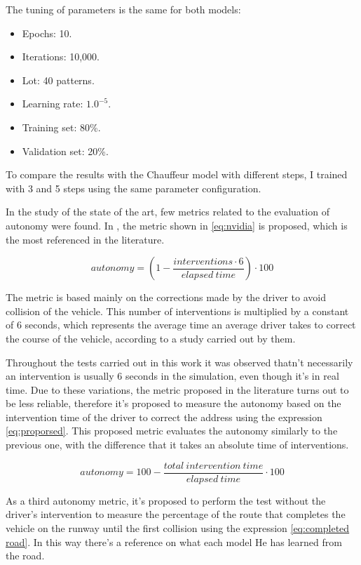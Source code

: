 \documentclass[conference]{IEEEtran}
\begin{document}
The tuning of parameters is the same for both models:
\begin{itemize}
	\item Epochs: 10.
	\item Iterations: 10,000.
	\item Lot: 40 patterns.
	\item Learning rate: $1.0^{-5}$.
	\item Training set: 80\%.
	\item Validation set: 20\%.
\end{itemize}

To compare the results with the Chauffeur model with different steps, I trained with 3 and 5 steps using the same parameter configuration.

In the study of the state of the art, few metrics related to the evaluation of autonomy were found. In \cite{bojarski2016end}, the metric shown in \eqref{eq:nvidia} is proposed, which is the most referenced in the literature.

\begin{equation}
autonomy = (1 - \frac{interventions \cdot 6}{elapsed\ time}) \cdot 100
\label{eq:nvidia}
\end{equation}

The metric is based mainly on the corrections made by the driver to avoid collision of the vehicle. This number of interventions is multiplied by a constant of 6 seconds, which represents the average time an average driver takes to correct the course of the vehicle, according to a study carried out by them.

Throughout the tests carried out in this work it was observed thatn't necessarily an intervention is usually 6 seconds in the simulation, even though it's in real time. Due to these variations, the metric proposed in the literature turns out to be less reliable, therefore it's proposed to measure the autonomy based on the intervention time of the driver to correct the address using the expression \ref{eq:proporsed}. This proposed metric evaluates the autonomy similarly to the previous one, with the difference that it takes an absolute time of interventions.

\begin{equation}
autonomy = 100 - \frac{total\ intervention\ time}{elapsed\ time}\cdot 100
\label{eq:proporsed}
\end{equation}

As a third autonomy metric, it's proposed to perform the test without the driver's intervention to measure the percentage of the route that completes the vehicle on the runway until the first collision using the expression \eqref{eq:completed road}. In this way there's a reference on what each model He has learned from the road.
\end{document}
